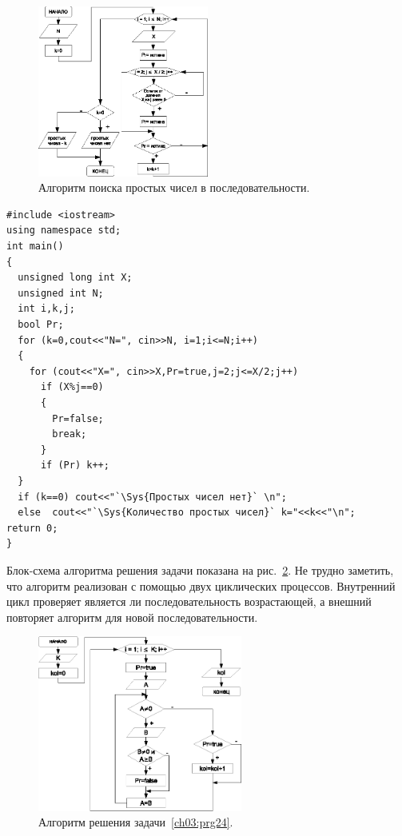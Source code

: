 \begin{figure}[htb]
\begin{center}
\includegraphics[width=0.5\textwidth]{img/ris_3_37}
\caption{Алгоритм поиска простых чисел в последовательности.}
\label{ch03:refDrawing36}
\end{center}
\end{figure}

\begin{lstlisting}
#include <iostream>
using namespace std;
int main()
{
  unsigned long int X; 
  unsigned int N; 
  int i,k,j;
  bool Pr;
  for (k=0,cout<<"N=", cin>>N, i=1;i<=N;i++)
  {
    for (cout<<"X=", cin>>X,Pr=true,j=2;j<=X/2;j++)
      if (X%j==0) 
      {
        Pr=false;
        break;
      }
      if (Pr) k++;
  }
  if (k==0) cout<<"`\Sys{Простых чисел нет}` \n";
  else  cout<<"`\Sys{Количество простых чисел}` k="<<k<<"\n";
return 0;
}
\end{lstlisting}


Блок-схема алгоритма решения задачи показана на рис.~\ref{ch03:refDrawing37}. Не трудно заметить, что алгоритм реализован с
помощью двух циклических процессов. Внутренний цикл проверяет является ли последовательность возрастающей, а внешний
повторяет алгоритм для новой последовательности.

\begin{figure}[htb]
\begin{center}
\includegraphics[width=0.6\textwidth]{img/ris_3_38}
\caption{Алгоритм решения задачи~\ref{ch03:prg24}.}
\label{ch03:refDrawing37}
\end{center}
\end{figure}

